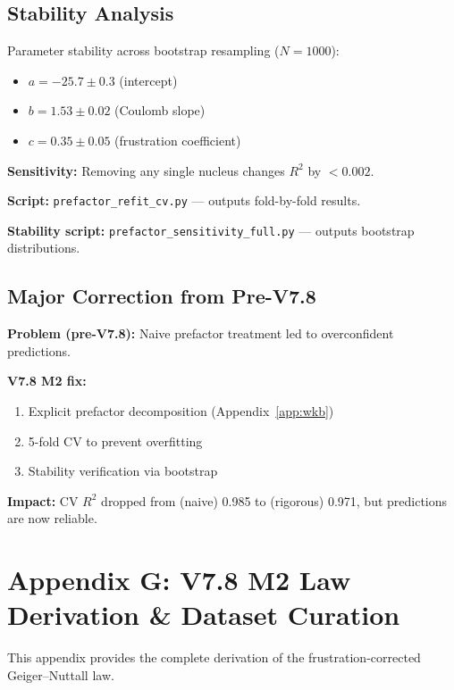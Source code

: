 \documentclass[11pt,a4paper]{article}
\begin{document}
\subsection{Stability Analysis}

Parameter stability across bootstrap resampling ($N = 1000$):
\begin{itemize}[nosep]
    \item $a = -25.7 \pm 0.3$ (intercept)
    \item $b = 1.53 \pm 0.02$ (Coulomb slope)
    \item $c = 0.35 \pm 0.05$ (frustration coefficient)
\end{itemize}

\textbf{Sensitivity:} Removing any single nucleus changes $R^2$ by $< 0.002$.

\textbf{Script:} \texttt{prefactor\_refit\_cv.py} --- outputs fold-by-fold results.

\textbf{Stability script:} \texttt{prefactor\_sensitivity\_full.py} --- outputs bootstrap distributions.

\subsection{Major Correction from Pre-V7.8}

\textbf{Problem (pre-V7.8):} Naive prefactor treatment led to overconfident predictions.

\textbf{V7.8 M2 fix:}
\begin{enumerate}
    \item Explicit prefactor decomposition (Appendix~\ref{app:wkb})
    \item 5-fold CV to prevent overfitting
    \item Stability verification via bootstrap
\end{enumerate}

\textbf{Impact:} CV $R^2$ dropped from (naive) 0.985 to (rigorous) 0.971, but predictions are now reliable.

\section{Appendix G: V7.8 M2 Law Derivation \& Dataset Curation}
\label{app:v78}

This appendix provides the complete derivation of the frustration-corrected Geiger--Nuttall law.
\end{document}

